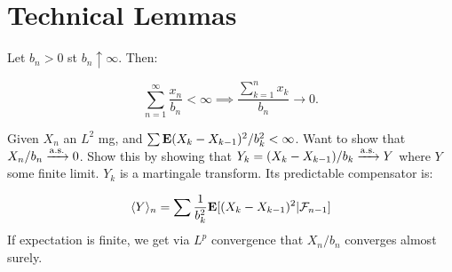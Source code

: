 \documentclass{article}
\begin{document}
\section{Technical Lemmas}

\begin{theorem}
Let $b_n>0$ st $b_n\uparrow\infty$. Then:

$$\sum_{n=1}^\infty \frac{x_n}{b_n} <\infty \implies \frac{\sum_{k=1}^n x_k}{b_n} \to 0.$$
\end{theorem}


\begin{example}[(2011 Q5)]
Given $X_n$ an $L^2$ mg, and $\sum \mathbf{E} (X_k - X_{k-1})^2 / b_k^2 <\infty$.  Want to show that $X_n/b_n \xrightarrow{\mathrm{a.s.}} 0$. Show this by showing that $Y_k = (X_k - X_{k-1})/b_k \xrightarrow{\mathrm{a.s.}} Y$ where $Y$ some finite limit. $Y_k$ is a martingale transform. Its predictable compensator is:

$$\langle Y\rangle_n = \sum \frac{1}{b_k^2} \mathbf{E}[(X_k - X_{k-1})^2|\mathcal F_{n-1}]$$
If expectation is finite, we get via $L^p$ convergence that $X_n/b_n$ converges almost surely. 
\end{example}
\end{document}
